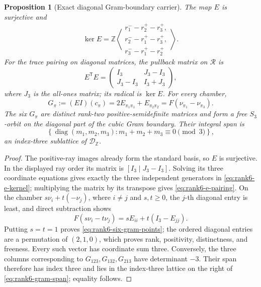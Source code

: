 \documentclass[11pt]{article}
\newtheorem{proposition}[theorem]{Proposition}
\theoremstyle{definition}
\theoremstyle{remark}
\numberwithin{equation}{section}
\begin{document}
\begin{proposition}[Exact diagonal Gram-boundary carrier]
\label{prop:rank6-gram-carrier}
The map \(E\) is surjective and
\begin{equation}
 \ker E=\mathbb Z\left\langle
 \begin{array}{l}
 r_1^--r_2^+-r_3^+,\\
 r_2^--r_1^+-r_3^+,\\
 r_3^--r_1^+-r_2^+
 \end{array}\right\rangle.                              \label{eq:rank6-e-kernel}
\end{equation}
For the trace pairing on diagonal matrices, the pullback matrix on
\(\mathscr R\) is
\begin{equation}
 E^{\mathsf T}E=
 \begin{pmatrix}
 I_3&J_3-I_3\\
 J_3-I_3&I_3+J_3
 \end{pmatrix},                                        \label{eq:rank6-e-pairing}
\end{equation}
where \(J_3\) is the all-ones matrix; its radical is \(\ker E\).
For every chamber,
\begin{equation}
 G_\pi:=(EI)(c_\pi)
 =2E_{\pi_1\pi_1}+E_{\pi_2\pi_2}
 =F(\nu_{\pi_1}-\nu_{\pi_3}).                         \label{eq:rank6-six-gram-points}
\end{equation}
The six \(G_\pi\) are distinct rank-two positive-semidefinite matrices and
form a free \(S_3\)-orbit on the diagonal part of the cubic Gram boundary.
Their integral span is
\begin{equation}
 \left\{\operatorname{diag}(m_1,m_2,m_3):
 m_1+m_2+m_3\equiv0\pmod3\right\},                     \label{eq:rank6-gram-span}
\end{equation}
an index-three sublattice of \(\mathscr D_{\mathbb Z}\).
\end{proposition}

\begin{proof}
The positive-ray images already form the standard basis, so \(E\) is
surjective.  In the displayed ray order its matrix is
\([I_3\mid J_3-I_3]\).  Solving its three coordinate equations gives
exactly the three independent generators in \eqref{eq:rank6-e-kernel};
multiplying the matrix by its transpose gives
\eqref{eq:rank6-e-pairing}.  On the chamber
\(s\nu_i+t(-\nu_j)\), where \(i\ne j\) and \(s,t\geq0\), the \(j\)-th
diagonal entry is least, and direct subtraction shows
\[
 F(s\nu_i-t\nu_j)=sE_{ii}+t(I_3-E_{jj}).
\]
Putting \(s=t=1\) proves \eqref{eq:rank6-six-gram-points}; the ordered
diagonal entries are a permutation of \((2,1,0)\), which proves rank, positivity,
distinctness, and freeness.  Every such vector has coordinate sum three.
Conversely, the three columns corresponding to
\(G_{123},G_{132},G_{213}\) have determinant \(-3\).  Their span therefore
has index three and lies in the index-three lattice on the right of
\eqref{eq:rank6-gram-span}; equality follows.
\end{proof}
\end{document}
